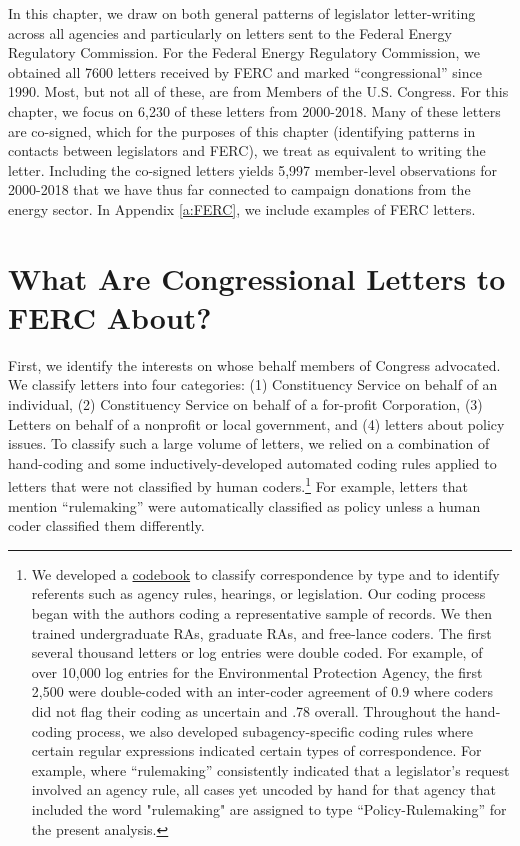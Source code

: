 \documentclass{article}
\begin{document}
In this chapter, we draw on both general patterns of legislator letter-writing across all agencies and particularly on letters sent to the Federal Energy Regulatory Commission.  For the Federal Energy Regulatory Commission, we obtained all 7600 letters received by FERC and marked ``congressional'' since 1990. Most, but not all of these, are from Members of the U.S. Congress. For this chapter, we focus on 6,230 of these letters from 2000-2018. Many of these letters are co-signed, which for the purposes of this chapter (identifying patterns in contacts between legislators and FERC), we treat as equivalent to writing the letter.  Including the co-signed letters yields 5,997 member-level observations for 2000-2018 that we have thus far connected to campaign donations from the energy sector. In Appendix \ref{a:FERC}, we include examples of FERC letters.  

\section{What Are Congressional Letters to FERC About?}

First, we identify the interests on whose behalf members of Congress advocated.  We classify letters into four categories: (1) Constituency Service on behalf of an individual, (2) Constituency Service on behalf of a for-profit Corporation, (3) Letters on behalf of a nonprofit or local government, and  (4) letters about policy issues. To classify such a large volume of letters, we relied on a combination of hand-coding and some inductively-developed automated coding rules applied to letters that were not classified by human coders.\footnote{We developed a \href{https://docs.google.com/document/d/1fJxjXjAyRL9vX-16fSsH29anXZc-W74GMf_7BSgWkws/edit}{codebook} to classify correspondence by type and to identify referents such as agency rules, hearings, or legislation. Our coding process began with the authors coding a representative sample of records. We then trained undergraduate RAs, graduate RAs, and free-lance coders. The first several thousand letters or log entries were double coded. For example, of over 10,000 log entries for the Environmental Protection Agency, the first 2,500 were double-coded with an inter-coder agreement of 0.9 where coders did not flag their coding as uncertain and .78 overall. Throughout the hand-coding process, we also developed subagency-specific coding rules where certain regular expressions indicated certain types of correspondence. For example, where ``rulemaking'' consistently indicated that a legislator's request involved an agency rule, all cases yet uncoded by hand for that agency that included the word "rulemaking" are assigned to type ``Policy-Rulemaking'' for the present analysis.} For example, letters that mention ``rulemaking'' were automatically classified as policy unless a human coder classified them differently.
\end{document}

